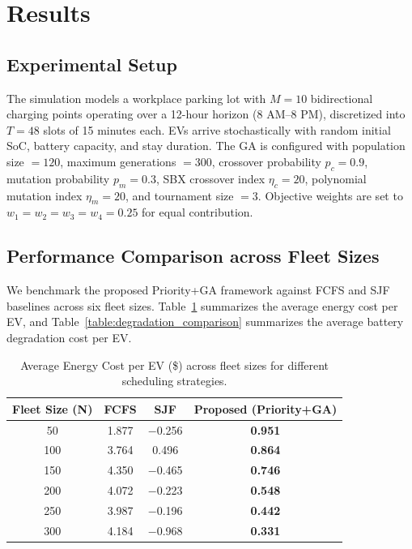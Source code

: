\section{Results}

\subsection{Experimental Setup}
\noindent The simulation models a workplace parking lot with $M = 10$ bidirectional charging points operating over a 12-hour horizon (8 AM--8 PM), discretized into $T = 48$ slots of 15 minutes each. EVs arrive stochastically with random initial SoC, battery capacity, and stay duration. The GA is configured with population size $= 120$, maximum generations $= 300$, crossover probability $p_c = 0.9$, mutation probability $p_m = 0.3$, SBX crossover index $\eta_c = 20$, polynomial mutation index $\eta_m = 20$, and tournament size $= 3$. Objective weights are set to $w_1 = w_2 = w_3 = w_4 = 0.25$ for equal contribution.

\subsection{Performance Comparison across Fleet Sizes}

\noindent We benchmark the proposed Priority+GA framework against FCFS and SJF baselines across six fleet sizes. Table~\ref{table:cost_comparison} summarizes the average energy cost per EV, and Table~\ref{table:degradation_comparison} summarizes the average battery degradation cost per EV.

\begin{table}[h!]
    \centering
    \caption{Average Energy Cost per EV (\$) across fleet sizes for different scheduling strategies.}
    \begin{tabular}{ |c|c|c|c| }
     \hline
     \textbf{Fleet Size (N)} & \textbf{FCFS} & \textbf{SJF} & \textbf{Proposed (Priority+GA)} \\
     \hline
     50  & 1.877 & $-$0.256 & \textbf{0.951} \\
     \hline
     100 & 3.764 & 0.496  & \textbf{0.864} \\
     \hline
     150 & 4.350 & $-$0.465 & \textbf{0.746} \\
     \hline
     200 & 4.072 & $-$0.223 & \textbf{0.548} \\
     \hline
     250 & 3.987 & $-$0.196 & \textbf{0.442} \\
     \hline
     300 & 4.184 & $-$0.968 & \textbf{0.331} \\
     \hline
    \end{tabular}
    \label{table:cost_comparison}
\end{table}

